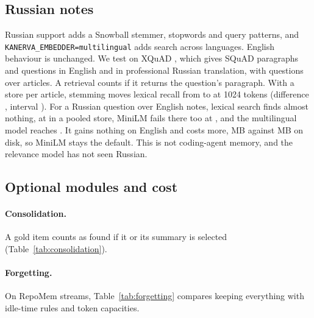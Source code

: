 \begin{table}[!htb]\centering\scriptsize
\caption{Answers on facts that changed, main test: percent of answers that give the old value, and of queries with a stale note in the context.}\label{tab:answerstale}
\resizebox{\columnwidth}{!}{}
\end{table}

\subsection{Russian notes}\label{sec:russian}
Russian support adds a Snowball stemmer, stopwords and query patterns, and \texttt{KANERVA\_EMBEDDER=multilingual} adds search across languages. English behaviour is unchanged. We test on XQuAD \cite{artetxe2020xquad}, which gives SQuAD paragraphs and questions in English and in professional Russian translation, with  questions over  articles. A retrieval counts if it returns the question's paragraph. With a store per article, stemming moves lexical recall from  to  at 1024 tokens (difference , interval ). For a Russian question over English notes, lexical search finds almost nothing, at  in a pooled store, MiniLM fails there too at , and the multilingual model reaches . It gains nothing on English and costs more,  MB against  MB on disk, so MiniLM stays the default. This is not coding-agent memory, and the relevance model has not seen Russian.

\subsection{Optional modules and cost}\label{sec:optional}
\paragraph{Consolidation.} A gold item counts as found if it or its summary is selected (Table~\ref{tab:consolidation}). \consolidationsummary{}

\paragraph{Forgetting.} On RepoMem streams, Table~\ref{tab:forgetting} compares keeping everything with idle-time rules and token capacities. \forgettingsummary

